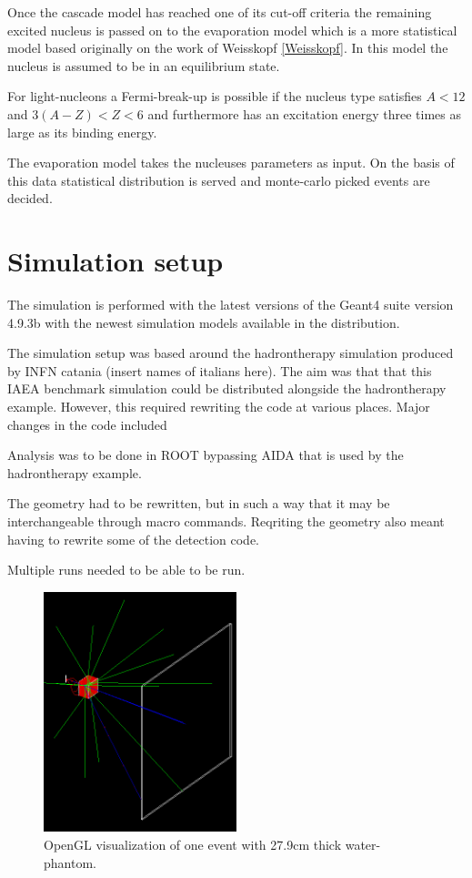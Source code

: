 Once the cascade model has reached one of its cut-off criteria the remaining excited nucleus is passed on to the evaporation model which is a more statistical model based originally on the work of Weisskopf \ref{Weisskopf}. In this model the nucleus is assumed to be in an equilibrium state.

For light-nucleons a Fermi-break-up is possible if the nucleus type satisfies $A < 12$ and $3(A - Z) < Z < 6$ and furthermore has an excitation energy three times as large as its binding energy.

The evaporation model takes the nucleuses parameters as input. On the basis of this data statistical distribution is served and monte-carlo picked events are decided.




\section{Simulation setup} %
The simulation is performed with the latest versions of the Geant4 suite version 4.9.3b with the newest simulation models available in the distribution.

The simulation setup was based around the hadrontherapy simulation produced by INFN catania (insert names of italians here). The aim was that that this IAEA benchmark simulation could be distributed alongside the hadrontherapy example. However, this required rewriting the code at various places. Major changes in the code included

Analysis was to be done in ROOT bypassing AIDA that is used by the hadrontherapy example.

The geometry had to be rewritten, but in such a way that it may be interchangeable through macro commands. Reqriting the geometry also meant having to rewrite some of the detection code.

Multiple runs needed to be able to be run.


\begin{figure}[ht] 
\begin{center}
\includegraphics[width=0.5\textwidth]{images/oneEvent.png}  
\caption{\label{fig:oneEvent} OpenGL visualization of one event with 27.9cm thick water-phantom.}
\end{center}
\end{figure}

